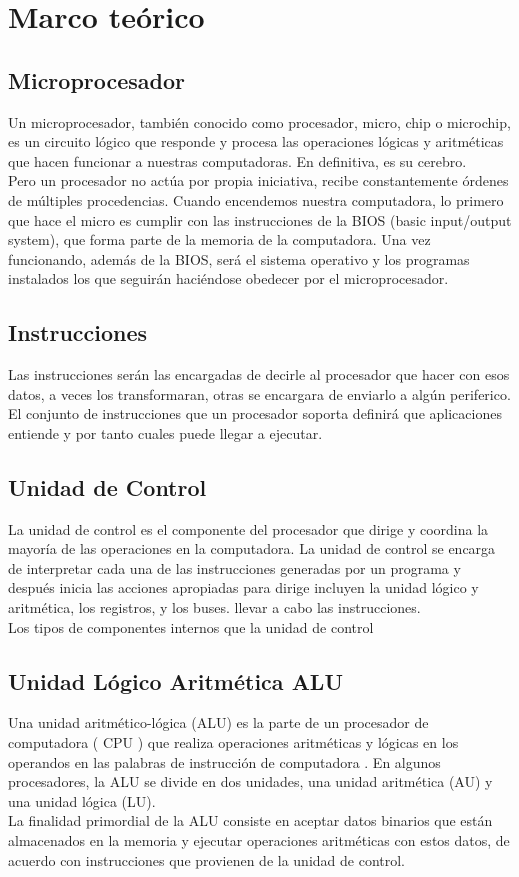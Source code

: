 \documentclass[conference]{IEEEtran}
\begin{document}
\section{Marco teórico}

\subsection{Microprocesador}

Un microprocesador, también conocido como procesador, micro, chip o microchip, es un circuito lógico que responde y procesa las operaciones lógicas y aritméticas que hacen funcionar a nuestras computadoras. En definitiva, es su cerebro.
\\
Pero un procesador no actúa por propia iniciativa, recibe constantemente órdenes de múltiples procedencias. Cuando encendemos nuestra computadora, lo primero que hace el micro es cumplir con las instrucciones de la BIOS (basic input/output system), que forma parte de la memoria de la computadora. Una vez funcionando, además de la BIOS, será el sistema operativo y los programas instalados los que seguirán haciéndose obedecer por el microprocesador.

\subsection{Instrucciones}
Las instrucciones serán las encargadas de decirle al procesador que hacer con esos datos, a veces los 
transformaran, otras se encargara de enviarlo a algún periferico.
\\
El conjunto de instrucciones que un procesador soporta definirá que aplicaciones entiende y por tanto cuales puede llegar a ejecutar.
\subsection{Unidad de Control}
La unidad de control es el componente del procesador que dirige y coordina la mayoría de las 
operaciones en la computadora. La unidad de control se encarga de interpretar cada una de 
 las instrucciones generadas por un programa y después inicia las acciones apropiadas para 
 dirige incluyen la unidad lógico y aritmética, los registros, y los buses.
 llevar a cabo las instrucciones.\\
Los tipos de componentes internos que la unidad de control 

\subsection{Unidad Lógico Aritmética \textbf{ALU}}
Una unidad aritmético-lógica (ALU) es la parte de un procesador de computadora ( CPU ) que realiza 
operaciones aritméticas y lógicas en los operandos en las palabras de instrucción de computadora . 
En algunos procesadores, la ALU se divide en dos unidades, una unidad aritmética (AU) y una unidad lógica (LU).
\\
La finalidad primordial de la ALU consiste en aceptar datos binarios que están almacenados en la memoria y 
ejecutar operaciones aritméticas con estos datos, de acuerdo con instrucciones que provienen de la unidad 
de control.
\end{document}
